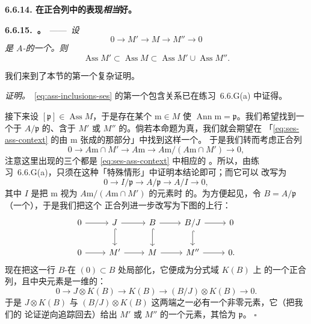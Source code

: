 \textbf{6.6.14. \trAssociatedPoint{}在正合列中的表现\emph{相当}好。}

\textbf{6.6.15.\ \trhProposition。}\ ——\ \emph{设
\begin{equation*}\tag{6.6.15.1}\label{eq:ses-ass-context}
0\longrightarrow M'\longrightarrow M\longrightarrow M''\longrightarrow 0
\end{equation*}
是 $A$-\trModule{}的一个\trShortExactSequence。则
\begin{equation*}\tag{6.6.15.2}\label{eq:ass-inclusions-ses}
\operatorname{Ass}M'\subset\operatorname{Ass}M\subset\operatorname{Ass}M'\cup\operatorname{Ass}M''.
\end{equation*}}

我们来到了本节的第一个复杂证明。

\emph{证明。}\ \eqref{eq:ass-inclusions-ses} 的第一个包含关系已在练习~6.6.G(a) 中证得。

接下来设 $[\mathfrak{p}]\in\operatorname{Ass}M$，于是存在某个 $\mathrm{m}\in M$ 使
$\operatorname{Ann}\mathrm{m}=\mathfrak{p}$。我们希望找到一个\trIsomorphic{}于
$A/\mathfrak{p}$ 的、含于 $M'$ 或 $M''$ 的\trSubmodule。倘若本命题为真，我们就会期望在
「\eqref{eq:ses-ass-context} 的由 $\mathrm{m}$ 张成的那部分」中找到这样一个\trSubmodule。
于是我们转而考虑正合列
\[
0\longrightarrow A\mathrm{m}\cap M'\longrightarrow A\mathrm{m}
  \longrightarrow A\mathrm{m}/(A\mathrm{m}\cap M')\longrightarrow 0,
\]
注意这里出现的三个\trModule{}都是 \eqref{eq:ses-ass-context} 中相应\trModule{}的%
\trSubmodule。所以，由练习~6.6.G(a)，只须在这种「特殊情形」中证明本结论即可；而它可以
改写为
\[
0\longrightarrow I/\mathfrak{p}\longrightarrow A/\mathfrak{p}\longrightarrow A/I
  \longrightarrow 0,
\]
其中 $I$ 是把 $\mathrm{m}$ 视为\trModule{} $A\mathrm{m}/(A\mathrm{m}\cap M')$ 的元素时
的\trAnnihilatorIdeal{}。为方便起见，令 $B=A/\mathfrak{p}$（一个\trIntegralDomain），于是我们把这个
正合列进一步改写为下图的上行：
\[
\begin{tikzcd}
0 \ar[r] & J \ar[r] \ar[d,hook] & B \ar[r] \ar[d,hook] & B/J \ar[r] \ar[d,hook] & 0 \\
0 \ar[r] & M' \ar[r] & M \ar[r] & M'' \ar[r] & 0.
\end{tikzcd}
\]
现在把这一行 $B$-\trModule{}在 $(0)\subset B$ 处局部化，它便成为分式域 $K(B)$ 上%
\trVectorSpace{}的一个正合列，且中央元素是一维的：
\[
0\longrightarrow J\otimes K(B)\longrightarrow K(B)
  \longrightarrow(B/J)\otimes K(B)\longrightarrow 0.
\]
于是 $J\otimes K(B)$ 与 $(B/J)\otimes K(B)$ 这两端之一必有一个非零元素，它（把我们的
论证逆向追踪回去）给出 $M'$ 或 $M''$ 的一个元素，其\trAnnihilatorIdeal{}恰为 $\mathfrak{p}$。%
\hfill$\square$

